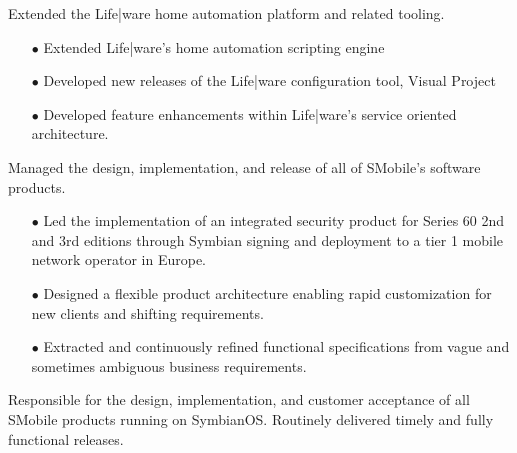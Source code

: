 \documentclass[12pt,letter,roman]{moderncv}
\begin{document}
\vspace{0.5em}

Extended the Life|ware home automation platform and related tooling.

\begin{itemize}
    \item[$\bullet$] Extended Life|ware's home automation scripting engine
    \item[$\bullet$] Developed new releases of the Life|ware configuration tool, Visual Project
    \item[$\bullet$] Developed feature enhancements within Life|ware's service oriented architecture.
\end{itemize}

\vspace{0.5em}
 {}{}

Managed the design, implementation, and release of all of SMobile's software
products.

\begin{itemize}

    \item[$\bullet$] Led the implementation of an integrated security product for Series
        60 2nd and 3rd editions through Symbian signing and deployment to a tier
        1 mobile network operator in Europe.

    \item[$\bullet$] Designed a flexible product architecture enabling rapid customization
        for new clients and shifting requirements.

    \item[$\bullet$] Extracted and continuously refined functional specifications from vague
        and sometimes ambiguous business requirements.

\end{itemize}

\vspace{0.5em}

Responsible for the design, implementation, and customer acceptance of all
SMobile products running on SymbianOS.  Routinely delivered timely and fully
functional releases.
\end{document}
